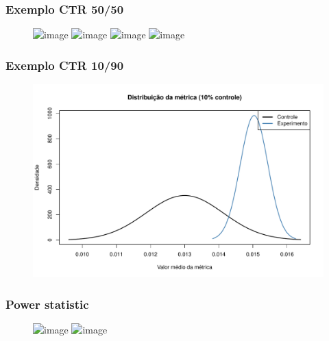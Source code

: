 \documentclass[xcolor=dvipsnames]{beamer}
\begin{document}
\begin{frame}%
\frametitle{Exemplo CTR 50/50}

\begin{figure}
\centering
\includegraphics<1>[scale=0.5]{img/ab_moving_average}
\includegraphics<2>[scale=0.5]{img/ab_intervalo_confianca}
\includegraphics<3>[scale=0.5]{img/ab_gaussiana_10k}
\includegraphics<4>[scale=0.5]{img/ab_gaussiana_100k}

\end{figure}

\end{frame}%


\begin{frame}%
\frametitle{Exemplo CTR 10/90}

\begin{figure}
\centering
\includegraphics[scale=0.5]{img/ab_gaussiana_split10}

\end{figure}

\end{frame}%



\begin{frame}%
\frametitle{Power statistic}

\begin{figure}
\centering
\includegraphics<1>[scale=0.8]{img/power}
\includegraphics<2>[scale=0.5]{img/ab_power}
\end{figure}

\end{frame}%
\end{document}
